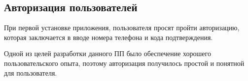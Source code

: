 \subsection{Авторизация пользователей}
\label{sec:usage:auth}

При первой установке приложения, пользователя просят пройти авторизацию, которая заключается в вводе номера телефона и кода подтверждения.




Одной из целей разработки данного ПП было обеспечение хорошего пользовательского опыта, поэтому авторизация получилось простой и понятной для пользователя.